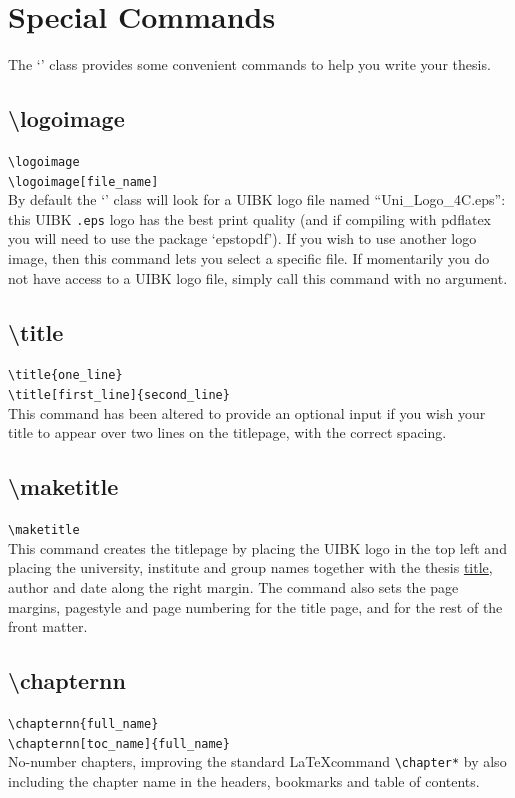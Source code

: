 \documentclass[bachelor]{iisthesis}
\begin{document}
\chapter{Special Commands}
The `\uibkclass' class provides some convenient commands to help you write your thesis.

\section{\textbackslash logoimage}
\texttt{\textbackslash logoimage}\\
\texttt{\textbackslash logoimage[file\_name]}\\[\baselineskip]
By default the `\uibkclass' class will look for a UIBK logo file named ``{Uni\_Logo\_4C.eps}'': this UIBK \texttt{.eps} logo has the best print quality (and if compiling with pdflatex you will need to use the package `epstopdf'). If you wish to use another logo image, then this command lets you select a specific file. If momentarily you do not have access to a UIBK logo file, simply call this command with no argument.

\section{\textbackslash title}
\label{sec:title}
\texttt{\textbackslash title\{one\_line\}}\\
\texttt{\textbackslash title[first\_line]\{second\_line\}}\\[\baselineskip]
This command has been altered to provide an optional input if you wish your title to appear over two lines on the titlepage, with the correct spacing.

\section{\textbackslash maketitle}
\texttt{\textbackslash maketitle}\\[\baselineskip]
This command creates the titlepage by placing the UIBK logo in the top left and placing the university, institute and group names together with the thesis \hyperref[sec:title]{title}, author and date along the right margin. The command also sets the page margins, pagestyle and page numbering for the title page, and for the rest of the front matter.

\section{\textbackslash chapternn}
\texttt{\textbackslash chapternn\{full\_name\}}\\
\texttt{\textbackslash chapternn[toc\_name]\{full\_name\}}\\[\baselineskip]
No-number chapters, improving the standard \LaTeX\space command \texttt{\textbackslash chapter*} by also including the chapter name in the headers, bookmarks and table of contents.
\end{document}
